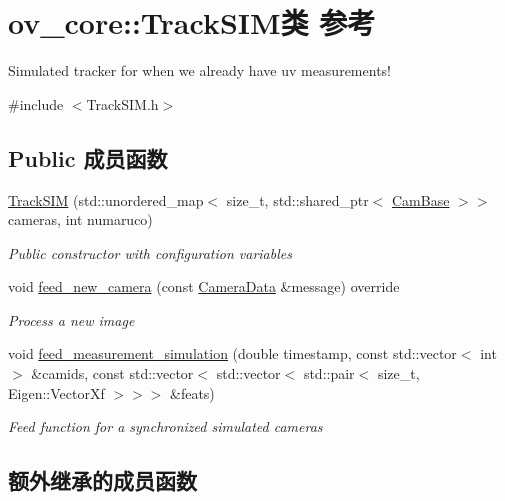 \hypertarget{classov__core_1_1TrackSIM}{}\section{ov\+\_\+core\+:\+:Track\+S\+I\+M类 参考}
\label{classov__core_1_1TrackSIM}


Simulated tracker for when we already have uv measurements!  




{\ttfamily \#include $<$Track\+S\+I\+M.\+h$>$}

\subsection*{Public 成员函数}
\begin{DoxyCompactItemize}
\item 
\hyperlink{classov__core_1_1TrackSIM_ac1b011188c7ec1af805b66bd5eaa29c8}{Track\+S\+IM} (std\+::unordered\+\_\+map$<$ size\+\_\+t, std\+::shared\+\_\+ptr$<$ \hyperlink{classov__core_1_1CamBase}{Cam\+Base} $>$$>$ cameras, int numaruco)
\begin{DoxyCompactList}\small\item\em Public constructor with configuration variables \end{DoxyCompactList}\item 
void \hyperlink{classov__core_1_1TrackSIM_a4c1537c48eec664a2c83dacc4b7e5778}{feed\+\_\+new\+\_\+camera} (const \hyperlink{structov__core_1_1CameraData}{Camera\+Data} \&message) override
\begin{DoxyCompactList}\small\item\em Process a new image \end{DoxyCompactList}\item 
void \hyperlink{classov__core_1_1TrackSIM_a00388c410c804854c4c91e1a392d44e0}{feed\+\_\+measurement\+\_\+simulation} (double timestamp, const std\+::vector$<$ int $>$ \&camids, const std\+::vector$<$ std\+::vector$<$ std\+::pair$<$ size\+\_\+t, Eigen\+::\+Vector\+Xf $>$$>$$>$ \&feats)
\begin{DoxyCompactList}\small\item\em Feed function for a synchronized simulated cameras \end{DoxyCompactList}\end{DoxyCompactItemize}
\subsection*{额外继承的成员函数}


